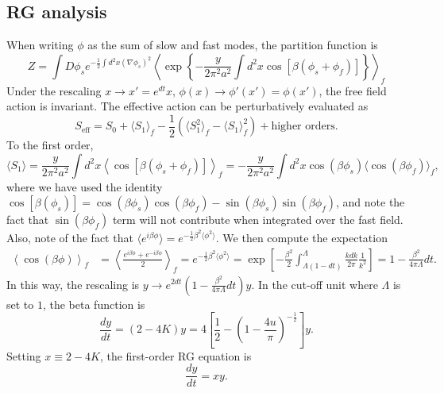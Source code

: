 \documentclass[aps,prb,superscriptaddress,nofootinbib]{revtex4}
\begin{document}
\subsection{RG analysis}
When writing $\phi$ as the sum of slow and fast modes, the partition function is
\begin{equation*}
	Z = \int D\phi_s e^{-\frac{1}{2}\int d^2x (\nabla\phi_s)^2}
	\left\langle\exp\left\{-\frac{y}{2\pi^2 a^2} \int d^2 x \cos\left[\beta(\phi_s+\phi_f)\right] \right\}\right\rangle_f
\end{equation*}
Under the rescaling $x \rightarrow x' = e^{dt} x$, $\phi(x) \rightarrow \phi'(x') = \phi(x')$, the free field action is invariant.
The effective action can be perturbatively evaluated as
\begin{equation*}
	S_{\mathrm{eff}} = S_0 + \langle S_1\rangle_f - \frac{1}{2}(\langle S_1^2\rangle_f - \langle S_1\rangle_f^2) + \text{higher orders}.
\end{equation*}
To the first order, 
\begin{equation*}
	\langle S_1\rangle = \frac{y}{2\pi^2 a^2} \int d^2 x \left\langle\cos\left[\beta(\phi_s+\phi_f)\right] \right\rangle_f 
	= -\frac{y}{2\pi^2 a^2} \int d^2 x \cos(\beta\phi_s)\langle\cos(\beta\phi_f)\rangle_f,
\end{equation*}
where we have used the identity $\cos\left[\beta(\phi_s)\right] = \cos(\beta\phi_s)\cos(\beta\phi_f)-\sin(\beta\phi_s)\sin(\beta\phi_f)$,
and note the fact that $\sin(\beta\phi_f)$ term will not contribute when integrated over the fast field. 
Also, note of the fact that $\langle e^{i\beta\phi}\rangle = e^{-\frac{1}{2}\beta^2 \langle\phi^2\rangle}$.
We then compute the expectation
\begin{equation*}
\begin{aligned}
	\left\langle \cos(\beta\phi)\right\rangle_f
	&= \left\langle \frac{e^{i\beta\phi} + e^{-i\beta\phi}}{2}\right\rangle_f
	= e^{-\frac{1}{2}\beta^2\langle\phi^2\rangle} 
	= \exp\left[-\frac{\beta^2}{2}\int^\Lambda_{\Lambda(1-dt)}\frac{k dk}{2\pi} \frac{1}{k^2} \right] 
	= 1-\frac{\beta^2}{4\pi\Lambda}dt.
\end{aligned}
\end{equation*}
In this way, the rescaling is $y \rightarrow e^{2dt}\left(1-\frac{\beta^2}{4\pi\Lambda}dt\right) y$.
In the cut-off unit where $\Lambda$ is set to $1$, the beta function is
\begin{equation*}
	\frac{dy}{dt} = (2-4K) y = 4\left[\frac{1}{2}-\left(1-\frac{4u}{\pi}\right)^{-\frac{1}{2}}\right]y.
\end{equation*}
Setting $x\equiv 2-4K$, the first-order RG equation is
\begin{equation}
	\frac{dy}{dt} = xy.
\end{equation}
\end{document}
